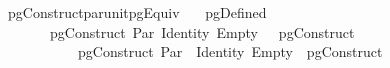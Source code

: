 \ pgConstruct{\isacharunderscore}par{\isacharunderscore}unit{\isacharunderscore}pgEquiv{\isacharcolon}\isanewline
\ \ \ {\isachardoublequoteopen}pgDefined\ \isanewline
\ \ \ \ \ \ \ {\isachardoublequoteopen}pgConstruct\ {\isacharparenleft}Par\ {\isacharparenleft}Identity\ Empty{\isacharparenright}\ \ {\isasymapprox}\ pgConstruct\ \isanewline
\ \ \ \ \ \ \ \ \ \ \ {\isachardoublequoteopen}pgConstruct\ {\isacharparenleft}Par\ \ {\isacharparenleft}Identity\ Empty{\isacharparenright}{\isacharparenright}\ {\isasymapprox}\ pgConstruct\ 
